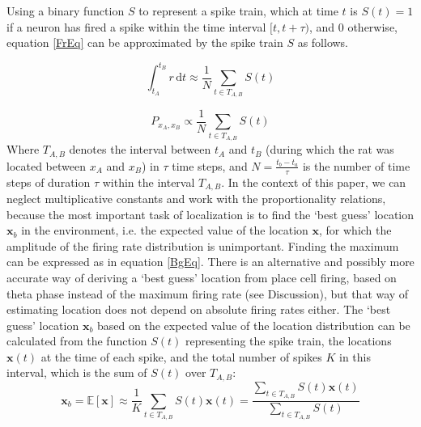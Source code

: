 
Using a binary function $ S $ to represent a spike train, which at time $ t $ is $ S(t)=1 $ if a neuron has fired a spike within the time interval $ [t, t+\tau) $, and $0$ otherwise, equation \eqref{FrEq} can be approximated by the spike train $ S $ as follows. 

\begin{equation}\label{McEq}
\int_{t_A}^{t_B}{r \, \mathrm{d}t} \approx \frac{1}{N} \sum_{t \in T_{A,B}}{S(t)}
\end{equation} 

\begin{equation}\label{SpkEq}
P_{x_A,x_B} \propto \frac{1}{N} \sum_{t \in T_{A,B}}{S(t)}
\end{equation} 
Where $ T_{A,B} $ denotes the interval between $ t_A $ and $ t_B $ (during which the rat was located between $ x_A $ and $ x_B $) in $ \tau $ time steps, and $ N=\frac{t_b-t_a}{\tau} $ is the number of time steps of duration $\tau$ within the interval $T_{A,B}$. In the context of this paper, we can neglect multiplicative constants and work with the proportionality relations, because the most important task of localization is to find the `best guess' location $ \boldsymbol x_b $ in the environment, i.e. the expected value of the location $ \boldsymbol x $, for which the amplitude of the firing rate distribution is unimportant. Finding the maximum can be expressed as in equation \eqref{BgEq}. There is an alternative and possibly more accurate \citep{Jensen2000} way of deriving a `best guess' location from place cell firing, based on theta phase instead of the maximum firing rate (see Discussion), but that way of estimating location does not depend on absolute firing rates either.
The `best guess' location $\boldsymbol x_b$ based on the expected value of the location distribution can be calculated from the function $S(t)$ representing the spike train, the locations $\boldsymbol x(t)$ at the time of each spike, and the total number of spikes $K$ in this interval, which is the sum of $S(t)$ over $T_{A,B}$: 
\begin{equation}\label{BgEq}
\boldsymbol x_b = \mathbb{E}[\boldsymbol x] \approx \frac{1}{K} \sum_{t \in T_{A,B}}{S(t) \boldsymbol x(t)} = \frac{\sum_{t \in T_{A,B}}{S(t) \boldsymbol x(t)}}{\sum_{t \in T_{A,B}}{S(t)}}
\end{equation} 

